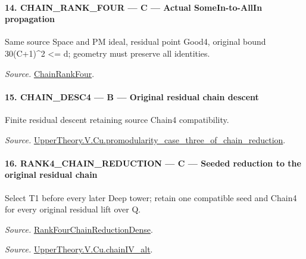 \paragraph{14. CHAIN\_\allowbreak RANK\_\allowbreak FOUR — C — Actual SomeIn-to-AllIn propagation}

Same source Space and PM ideal, residual point Good4, original bound 30(C+1)\textasciicircum{}2 <= d; geometry must preserve all identities.

\emph{Source.} \href{https://github.com/CocoSgt/riemann-hypothesis-lean/blob/7cbf7a0c32fca1badf05931879a37c3f8a2b03b4/src/Development/AutomorphicArithmetic/AutomorphicVarieties/ModularityArgument/ThresholdArguments/DenseThresholdCases/PromodularityCaseThree.lean#L26-L32}{ChainRankFour}.



\paragraph{15. CHAIN\_\allowbreak DESC4 — B — Original residual chain descent}

Finite residual descent retaining source Chain4 compatibility.

\emph{Source.} \href{https://github.com/CocoSgt/riemann-hypothesis-lean/blob/7cbf7a0c32fca1badf05931879a37c3f8a2b03b4/src/Development/AutomorphicArithmetic/AutomorphicVarieties/ModularityArgument/ThresholdArguments/DenseThresholdCases/PromodularityCaseThreeOfLemmas.lean#L131-L153}{UpperTheory.V.Cu.promodularity\_\allowbreak case\_\allowbreak three\_\allowbreak of\_\allowbreak chain\_\allowbreak reduction}.



\paragraph{16. RANK4\_\allowbreak CHAIN\_\allowbreak REDUCTION — C — Seeded reduction to the original residual chain}

Select T1 before every later Deep tower; retain one compatible seed and Chain4 for every original residual lift over Q.

\emph{Source.} \href{https://github.com/CocoSgt/riemann-hypothesis-lean/blob/7cbf7a0c32fca1badf05931879a37c3f8a2b03b4/src/Development/AutomorphicArithmetic/AutomorphicVarieties/ModularityArgument/ThresholdArguments/DenseThresholdCases/PromodularityCaseThree.lean#L33-L39}{RankFourChainReductionDense}.

\emph{Source.} \href{https://github.com/CocoSgt/riemann-hypothesis-lean/blob/7cbf7a0c32fca1badf05931879a37c3f8a2b03b4/src/Development/AutomorphicArithmetic/AutomorphicVarieties/ModularityArgument/ThresholdArguments/DenseThresholdCases/CuPChainIV.lean#L16-L82}{UpperTheory.V.Cu.chainIV\_\allowbreak alt}.



